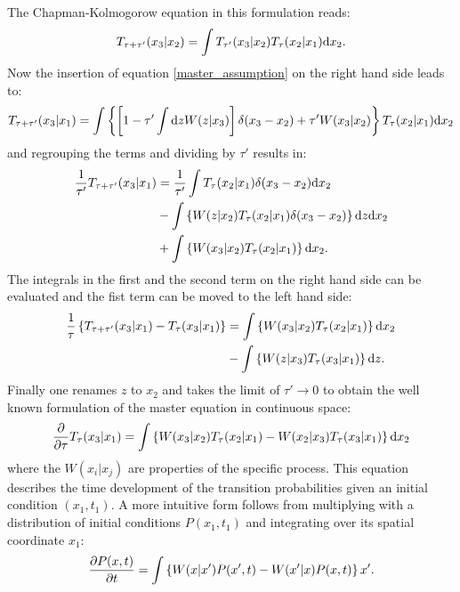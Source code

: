 The Chapman-Kolmogorow equation in this formulation reads:
\begin{equation}
    T_{\tau + \tau'}(x_3|x_2) = \int T_{\tau'}(x_3|x_2)T_{\tau}(x_2|x_1){\rm d} x_2.
    \label{K2}
\end{equation}
Now the insertion of equation \eqref{master_assumption} on the right hand side leads to:
\begin{equation*}
    T_{\tau+\tau'}(x_3|x_1) = \int \left\{ \left[1 - \tau' \int {\rm d} z W(z|x_3) \right] \delta(x_3 - x_2) + \tau' W(x_3|x_2) \right\} T_{\tau}(x_2|x_1){\rm d} x_2
\end{equation*}
and regrouping the terms and dividing by $\tau ' $ results in:
\begin{align*}
    \frac{1}{\tau'} T_{\tau+\tau'}(x_3|x_1) &= \frac{1}{\tau'}  \int T_{\tau}(x_2|x_1) \delta(x_3 - x_2){\rm d} x_2\\
    &- \int \left\{ W(z|x_2)  T_{\tau}(x_2|x_1)\delta(x_3 - x_2) \right\}{\rm d} z {\rm d} x_2 \\
    &+ \int \left\{ W(x_3|x_2) T_{\tau}(x_2|x_1) \right\}{\rm d} x_2.
\end{align*}
The integrals in the first and the second term on the right hand side can be evaluated and the fist term can be moved to the left hand side:
\begin{align*}
    \frac{1}{\tau}\left\{  T_{\tau+\tau'}(x_3|x_1) - T_{\tau}(x_3|x_1)\right\} &= \int \left\{ W(x_3|x_2) T_{\tau}(x_2|x_1) \right\}{\rm d} x_2  \nonumber \\
    &- \int \left\{ W(z|x_3)  T_{\tau}(x_3|x_1) \right\}{\rm d} z.
\end{align*}
Finally one renames $z$ to $x_2$ and takes the limit of $\tau' \rightarrow 0$ to obtain the well known formulation of the master equation in continuous space:
\begin{equation}
    \frac{\partial}{\partial \tau}T_{\tau}(x_3|x_1) = \int \left\{ W(x_3|x_2) T_{\tau}(x_2|x_1) - W(x_2|x_3) T_{\tau}(x_3|x_1) \right\}{\rm d} x_2
    \label{continuous_space_master_equation}
\end{equation}where the $W(x_i|x_j)$ are properties of the specific process.
This equation describes the time development of the transition probabilities given an initial condition $(x_1,t_1)$. A more intuitive form follows from multiplying with a distribution of initial conditions $P(x_1,t_1)$ and integrating over its spatial coordinate $x_1$:
\begin{equation}
    \frac{\partial P(x,t)}{\partial t} = \int \left\{ W(x|x') P(x',t) - W(x'|x)P(x,t) \right\} {\rm } x'.
\end{equation}
